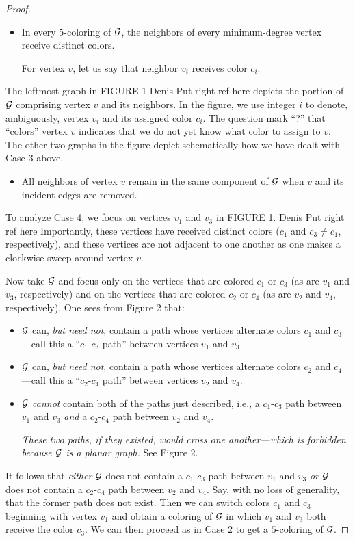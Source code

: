 {\begin{proof}
\begin{description}
\begin{itemize}
For the minimum-degree vertex $v$, let us call these neighbors $v_1$,
$v_2$, $v_3$, $v_4$, $v_5$, in clockwise order within the planar
drawing.
\item
In every $5$-coloring of $\mbox{$\cal G$}$, the neighbors of every minimum-degree
vertex receive distinct colors.

For vertex $v$, let us say that neighbor $v_i$ receives color $c_i$.
\end{itemize}
The leftmost graph in FIGURE 1 
{Denis Put right ref here}
depicts the portion of $\mbox{$\cal G$}$ comprising
vertex $v$ and its neighbors.  In the figure, we use integer $i$ to
denote, ambiguously, vertex $v_i$ and its assigned color $c_i$.  The
question mark ``?'' that ``colors'' vertex $v$ indicates that we do not
yet know what color to assign to $v$.  The other two graphs in the
figure depict schematically how we have dealt with Case 3 above.
\begin{itemize}
\item
All neighbors of vertex $v$ remain in the same component of $\mbox{$\cal G$}$ when
$v$ and its incident edges are removed.
\end{itemize}
\end{description}
To analyze Case 4, we focus on vertices $v_1$ and $v_3$ in FIGURE 1.
{Denis Put right ref here}
Importantly, these vertices have received distinct colors ($c_1$ and $c_3
\neq c_1$, respectively), and these vertices are not adjacent to one
another as one makes a clockwise sweep around vertex $v$.

Now take $\mbox{$\cal G$}$ and focus only on the vertices that are colored $c_1$ or
$c_3$ (as are $v_1$ and $v_3$, respectively) and on the vertices that are
colored $c_2$ or $c_4$ (as are $v_2$ and $v_4$, respectively).  One
sees from Figure 2 that:
\begin{itemize}
\item
$\mbox{$\cal G$}$ can, {\em but need not}, contain a path whose vertices alternate
  colors $c_1$ and $c_3$---call this a ``$c_1$-$c_3$ path'' between
  vertices $v_1$ and $v_3$.
\item
$\mbox{$\cal G$}$ can, {\em but need not}, contain a path whose vertices alternate
  colors $c_2$ and $c_4$---call this a ``$c_2$-$c_4$ path'' between
  vertices $v_2$ and $v_4$.
\item
$\mbox{$\cal G$}$ {\em cannot} contain both of the paths just described, i.e., a
  $c_1$-$c_3$ path between $v_1$ and $v_3$ {\em and} a $c_2$-$c_4$ path
  between $v_2$ and $v_4$.

{\em These two paths, if they existed, would cross one another---which
  is forbidden because $\mbox{$\cal G$}$ is a {\em planar} graph.}  See Figure 2.
\end{itemize}
It follows that {\em either} $\mbox{$\cal G$}$ does not contain a $c_1$-$c_3$ path
between $v_1$ and $v_3$ {\em or} $\mbox{$\cal G$}$ does not contain a $c_2$-$c_4$
path between $v_2$ and $v_4$.  Say, with no loss of generality, that
the former path does not exist.  Then we can switch colors $c_1$ and
$c_3$ beginning with vertex $v_1$ and obtain a coloring of $\mbox{$\cal G$}$ in which
$v_1$ and $v_3$ both receive the color $c_3$.  We can then proceed as
in Case 2 to get a $5$-coloring of $\mbox{$\cal G$}$.


\end{proof}}
